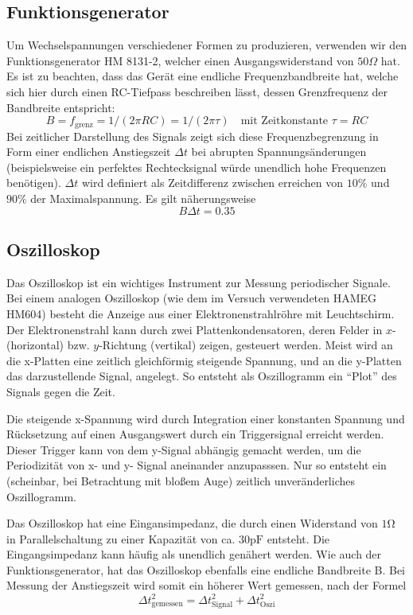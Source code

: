 \documentclass{article}
\begin{document}
\subsection{Funktionsgenerator}
Um Wechselspannungen verschiedener Formen zu produzieren, verwenden wir den Funktionsgenerator HM 8131-2,
welcher einen Ausgangswiderstand von $50\Omega$ hat. Es ist zu beachten, dass das Gerät eine endliche
Frequenzbandbreite hat, welche sich hier durch einen RC-Tiefpass beschreiben lässt, dessen Grenzfrequenz der
Bandbreite entspricht:
\begin{equation}
  B = f_\text{grenz} = 1/(2\pi RC) = 1 / (2\pi \tau) \quad \text{mit Zeitkonstante } \tau = RC
\end{equation}
Bei zeitlicher Darstellung des Signals zeigt sich diese Frequenzbegrenzung in Form einer endlichen Anstiegszeit $\Delta t$ bei abrupten
Spannungsänderungen (beispielsweise ein perfektes Rechtecksignal würde unendlich hohe Frequenzen benötigen). $\Delta t$ wird definiert
als Zeitdifferenz zwischen erreichen von $10 \%$ und $ 90\%$ der Maximalspannung. Es gilt näherungsweise
\begin{equation}
  B \Delta t = 0.35 \label{eq:bdeltat}
\end{equation}

\subsection{Oszilloskop}
Das Oszilloskop ist ein wichtiges Instrument zur Messung periodischer Signale. Bei einem analogen Oszilloskop
(wie dem im Versuch verwendeten HAMEG HM604)
besteht die Anzeige aus einer Elektronenstrahlröhre mit Leuchtschirm. Der Elektronenstrahl kann durch zwei Plattenkondensatoren,
deren Felder in $x$- (horizontal) bzw. $y$-Richtung (vertikal) zeigen, gesteuert werden. Meist wird an die x-Platten
eine zeitlich gleichförmig steigende Spannung, und an die y-Platten das darzustellende Signal, angelegt. So entsteht als
Oszillogramm ein \enquote{Plot} des Signals gegen die Zeit.

Die steigende x-Spannung wird durch Integration einer konstanten Spannung
und Rücksetzung auf einen Ausgangswert durch ein Triggersignal erreicht werden. Dieser Trigger kann von dem y-Signal abhängig
gemacht werden, um die Periodizität von x- und y- Signal aneinander anzupasssen. Nur so entsteht ein
(scheinbar, bei Betrachtung mit bloßem Auge) zeitlich unveränderliches Oszillogramm.

Das Oszilloskop hat eine Eingansimpedanz, die durch einen Widerstand von $1\mathrm{\Omega}$ in Parallelschaltung zu
einer Kapazität von ca. $30\mathrm{pF}$ entsteht. Die Eingangsimpedanz kann häufig als unendlich genähert werden.
Wie auch der Funktionsgenerator, hat das Oszilloskop ebenfalls eine endliche Bandbreite B. Bei Messung der Anstiegszeit
wird somit ein höherer Wert gemessen, nach der Formel
\begin{equation}
  \Delta t^2_\text{gemessen} = \Delta t^2_\text{Signal} + \Delta t^2_\text{Oszi} \label{eq:anstiegszeit-eff}
\end{equation}
\end{document}
